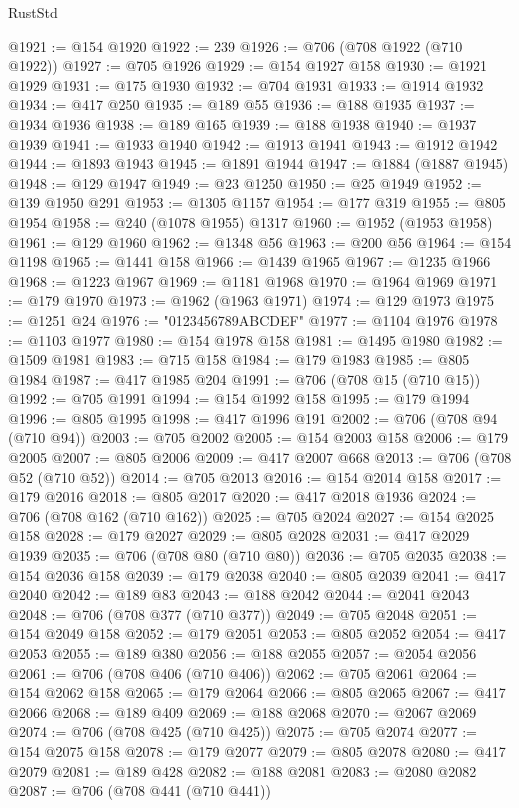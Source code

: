 \begin{lexlean}{RustStd}
\begin{coremodule}
@1921 := @154 @1920
@1922 := 239
@1926 := @706 (@708 @1922 (@710 @1922))
@1927 := @705 @1926
@1929 := @154 @1927 @158
@1930 := @1921 @1929
@1931 := @175 @1930
@1932 := @704 @1931
@1933 := @1914 @1932
@1934 := @417 @250
@1935 := @189 @55
@1936 := @188 @1935
@1937 := @1934 @1936
@1938 := @189 @165
@1939 := @188 @1938
@1940 := @1937 @1939
@1941 := @1933 @1940
@1942 := @1913 @1941
@1943 := @1912 @1942
@1944 := @1893 @1943
@1945 := @1891 @1944
@1947 := @1884 (@1887 @1945)
@1948 := @129 @1947
@1949 := @23 @1250
@1950 := @25 @1949
@1952 := @139 @1950 @291
@1953 := @1305 @1157
@1954 := @177 @319
@1955 := @805 @1954
@1958 := @240 (@1078 @1955) @1317
@1960 := @1952 (@1953 @1958)
@1961 := @129 @1960
@1962 := @1348 @56
@1963 := @200 @56
@1964 := @154 @1198
@1965 := @1441 @158
@1966 := @1439 @1965
@1967 := @1235 @1966
@1968 := @1223 @1967
@1969 := @1181 @1968
@1970 := @1964 @1969
@1971 := @179 @1970
@1973 := @1962 (@1963 @1971)
@1974 := @129 @1973
@1975 := @1251 @24
@1976 := "0123456789ABCDEF"
@1977 := @1104 @1976
@1978 := @1103 @1977
@1980 := @154 @1978 @158
@1981 := @1495 @1980
@1982 := @1509 @1981
@1983 := @715 @158
@1984 := @179 @1983
@1985 := @805 @1984
@1987 := @417 @1985 @204
@1991 := @706 (@708 @15 (@710 @15))
@1992 := @705 @1991
@1994 := @154 @1992 @158
@1995 := @179 @1994
@1996 := @805 @1995
@1998 := @417 @1996 @191
@2002 := @706 (@708 @94 (@710 @94))
@2003 := @705 @2002
@2005 := @154 @2003 @158
@2006 := @179 @2005
@2007 := @805 @2006
@2009 := @417 @2007 @668
@2013 := @706 (@708 @52 (@710 @52))
@2014 := @705 @2013
@2016 := @154 @2014 @158
@2017 := @179 @2016
@2018 := @805 @2017
@2020 := @417 @2018 @1936
@2024 := @706 (@708 @162 (@710 @162))
@2025 := @705 @2024
@2027 := @154 @2025 @158
@2028 := @179 @2027
@2029 := @805 @2028
@2031 := @417 @2029 @1939
@2035 := @706 (@708 @80 (@710 @80))
@2036 := @705 @2035
@2038 := @154 @2036 @158
@2039 := @179 @2038
@2040 := @805 @2039
@2041 := @417 @2040
@2042 := @189 @83
@2043 := @188 @2042
@2044 := @2041 @2043
@2048 := @706 (@708 @377 (@710 @377))
@2049 := @705 @2048
@2051 := @154 @2049 @158
@2052 := @179 @2051
@2053 := @805 @2052
@2054 := @417 @2053
@2055 := @189 @380
@2056 := @188 @2055
@2057 := @2054 @2056
@2061 := @706 (@708 @406 (@710 @406))
@2062 := @705 @2061
@2064 := @154 @2062 @158
@2065 := @179 @2064
@2066 := @805 @2065
@2067 := @417 @2066
@2068 := @189 @409
@2069 := @188 @2068
@2070 := @2067 @2069
@2074 := @706 (@708 @425 (@710 @425))
@2075 := @705 @2074
@2077 := @154 @2075 @158
@2078 := @179 @2077
@2079 := @805 @2078
@2080 := @417 @2079
@2081 := @189 @428
@2082 := @188 @2081
@2083 := @2080 @2082
@2087 := @706 (@708 @441 (@710 @441))

\end{coremodule}
\end{lexlean}
